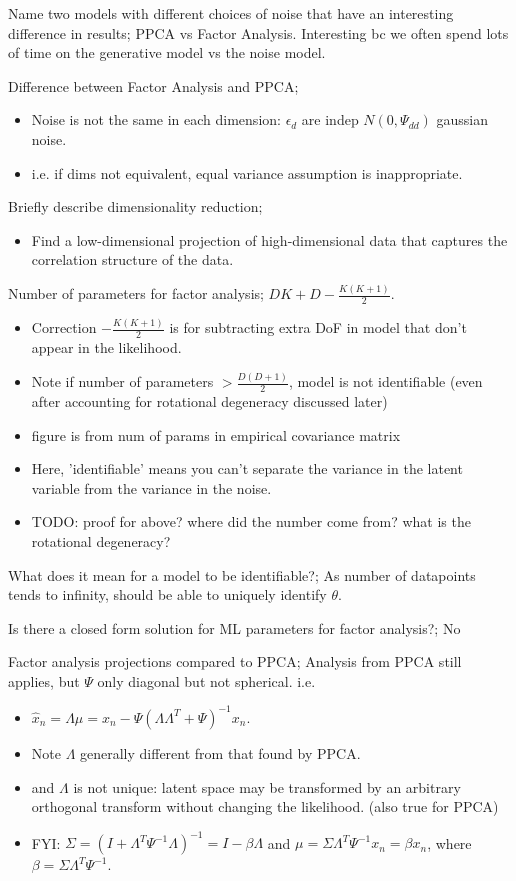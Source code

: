 \documentclass{article}
\begin{document}
Name two models with different choices of noise that have an interesting difference in results; PPCA vs Factor Analysis. \newline Interesting bc we often spend lots of time on the generative model vs the noise model.

Difference between Factor Analysis and PPCA; \begin{itemize} \item Noise is not the same in each dimension: $\epsilon_d$ are indep $N(0,\Psi_{dd})$ gaussian noise.  \item i.e. if dims not equivalent, equal variance assumption is inappropriate.  \end{itemize}

Briefly describe dimensionality reduction; \begin{itemize} \item Find a low-dimensional projection of high-dimensional data that captures the correlation structure of the data.  \end{itemize}

Number of parameters for factor analysis; $DK + D - \frac{K(K+1)}{2}$. \begin{itemize} \item Correction $- \frac{K(K+1)}{2}$ is for subtracting extra DoF in model that don't appear in the likelihood.  \item Note if number of parameters $> \frac{D(D+1)}{2}$, model is not identifiable (even after accounting for rotational degeneracy discussed later) \item figure is from num of params in empirical covariance matrix \item Here, 'identifiable' means you can't separate the variance in the latent variable from the variance in the noise.  \item TODO: proof for above? where did the number come from? what is the rotational degeneracy?  \end{itemize}

What does it mean for a model to be identifiable?; As number of datapoints tends to infinity, should be able to uniquely identify $\theta$.

Is there a closed form solution for ML parameters for factor analysis?; No

Factor analysis projections compared to PPCA; Analysis from PPCA still applies, but $\Psi$ only diagonal but not spherical. i.e. \begin{itemize} \item $\hat{x}_n=\Lambda\mu=x_n - \Psi(\Lambda\Lambda^T+\Psi)^{-1}x_n$.  \item Note $\Lambda$ generally different from that found by PPCA.  \item and $\Lambda$ is not unique: latent space may be transformed by an arbitrary orthogonal transform without changing the likelihood. (also true for PPCA) \item FYI: $\Sigma = (I+\Lambda^T\Psi^{-1}\Lambda)^{-1}=I-\beta\Lambda$ and $\mu=\Sigma\Lambda^T\Psi^{-1}x_n=\beta x_n$, where $\beta = \Sigma\Lambda^T\Psi^{-1}$. \end{itemize}
\end{document}

